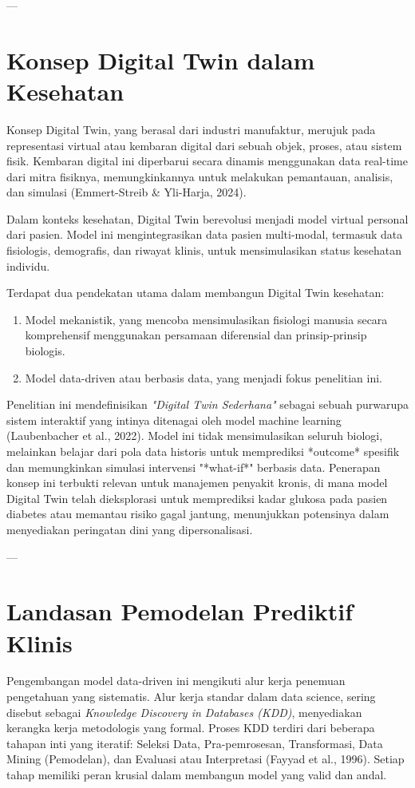 --- %
\section{Konsep Digital Twin dalam Kesehatan}
Konsep Digital Twin, yang berasal dari industri manufaktur, merujuk pada representasi virtual atau kembaran digital dari sebuah objek, proses, atau sistem fisik. Kembaran digital ini diperbarui secara dinamis menggunakan data real-time dari mitra fisiknya, memungkinkannya untuk melakukan pemantauan, analisis, dan simulasi (Emmert-Streib \& Yli-Harja, 2024).

Dalam konteks kesehatan, Digital Twin berevolusi menjadi model virtual personal dari pasien. Model ini mengintegrasikan data pasien multi-modal, termasuk data fisiologis, demografis, dan riwayat klinis, untuk mensimulasikan status kesehatan individu.

Terdapat dua pendekatan utama dalam membangun Digital Twin kesehatan:
\begin{enumerate}
    \item Model mekanistik, yang mencoba mensimulasikan fisiologi manusia secara komprehensif menggunakan persamaan diferensial dan prinsip-prinsip biologis.
    \item Model data-driven atau berbasis data, yang menjadi fokus penelitian ini.
\end{enumerate}
Penelitian ini mendefinisikan \textit{"Digital Twin Sederhana"} sebagai sebuah purwarupa sistem interaktif yang intinya ditenagai oleh model machine learning (Laubenbacher et al., 2022). Model ini tidak mensimulasikan seluruh biologi, melainkan belajar dari pola data historis untuk memprediksi *outcome* spesifik dan memungkinkan simulasi intervensi "*what-if*" berbasis data. Penerapan konsep ini terbukti relevan untuk manajemen penyakit kronis, di mana model Digital Twin telah dieksplorasi untuk memprediksi kadar glukosa pada pasien diabetes atau memantau risiko gagal jantung, menunjukkan potensinya dalam menyediakan peringatan dini yang dipersonalisasi.

--- %
\section{Landasan Pemodelan Prediktif Klinis}
Pengembangan model data-driven ini mengikuti alur kerja penemuan pengetahuan yang sistematis. Alur kerja standar dalam data science, sering disebut sebagai \textit{Knowledge Discovery in Databases (KDD)}, menyediakan kerangka kerja metodologis yang formal. Proses KDD terdiri dari beberapa tahapan inti yang iteratif: Seleksi Data, Pra-pemrosesan, Transformasi, Data Mining (Pemodelan), dan Evaluasi atau Interpretasi (Fayyad et al., 1996). Setiap tahap memiliki peran krusial dalam membangun model yang valid dan andal.

